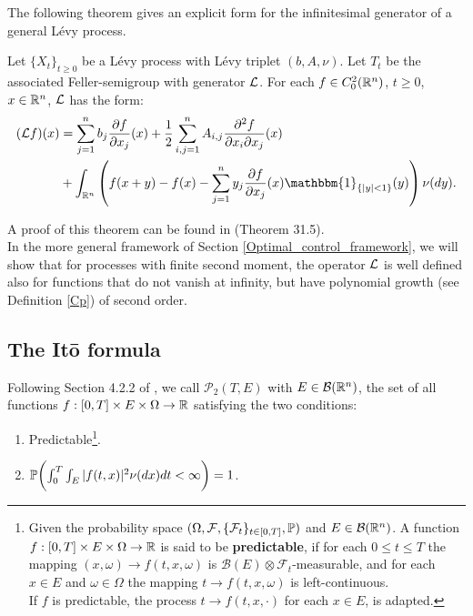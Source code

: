 The following theorem gives an explicit form for the infinitesimal generator 
of a general Lévy process.

\begin{Theorem}\label{Inf_gen_theorem}
 Let $\{X_t\}_{t \ge 0}$ be a Lévy process with Lévy triplet $(b,A,\nu)$. Let $T_t$ be the associated Feller-semigroup
 with generator $\mathcal{L}$. For each $f\in C_0^{2}(\mathbb{R}^n)$, $t\geq0$, $x\in \mathbb{R}^n$, 
  $\mathcal{L}$ has the form:
 \begin{align}\label{genLevy}
  (\LL f)(x) &=  \sum_{j=1}^n b_j \frac{\partial f}{\partial x_j}(x) +
  \frac{1}{2} \sum_{i,j=1}^n A_{i,j} \frac{\partial^2 f}{\partial x_i \partial x_j}(x)\\  
           & + \int_{\R^n} \left( f(x+y) - f(x) - \sum_{j=1}^n y_j \frac{\partial f}{\partial x_j}(x) 
           \mathbbm{1}_{\{ |y|<1 \}}(y) \right) \nu(dy).   \nonumber
  \end{align}
\end{Theorem}
A proof of this theorem can be found in \cite{Sato} (Theorem 31.5).\\

\noindent
In the more general framework of Section \ref{Optimal_control_framework}, we will show that for processes with finite second moment, the operator 
$\mathcal{L}$ is well defined also for functions that do not vanish at infinity, but have polynomial growth (see Definition \ref{Cp}) of second order. 

  
\subsection{The It\={o} formula} 

Following Section 4.2.2 of \cite{Applebaum}, we call $\mathcal{P}_2(T,E)$ with $E \in \mathcal{B}(\mathbb{R}^n)$, 
the set of all functions $f:[0,T]\times E \times \Omega \to \mathbb{R}$ satisfying the two conditions:
\begin{enumerate}
 \item Predictable\footnote{Given the probability space $(\Omega,\mathcal{F},\{\mathcal{F}_t\}_{t\in [0,T]},\mathbb{P})$ and $E \in \mathcal{B}(\mathbb{R}^n)$. 
 A function $f:[0,T]\times E \times \Omega \to \mathbb{R}$
 is said to be \textbf{predictable}, if for each $0 \leq t \leq T$ the mapping $(x,\omega) \to f(t,x,\omega)$ is $\mathcal{B}(E)\otimes \mathcal{F}_t$-measurable,
 and for each $x\in E$ and $\omega \in \Omega$ the mapping $t \to f(t,x,\omega)$ is left-continuous.\\
 If $f$ is predictable, the process $t \to f(t,x,\cdot)$ for each $x \in E$, is adapted.}.
 \item  $\mathbb{P} \biggl( \int_0^T \int_E |f(t,x)|^2 \nu(dx) dt  <\infty \biggr) = 1 $.
\end{enumerate}

